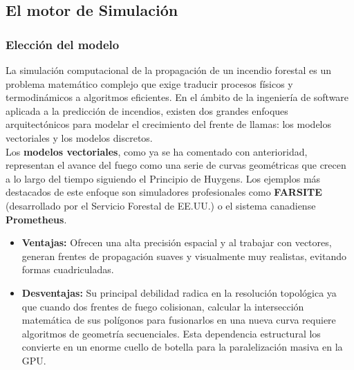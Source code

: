     \subsection{El motor de Simulación}
        \subsubsection*{Elección del modelo}
        La simulación computacional de la propagación de un incendio forestal es un problema matemático complejo que exige traducir procesos físicos y termodinámicos a algoritmos eficientes. En el ámbito de la ingeniería de software aplicada a la predicción de incendios, existen dos grandes enfoques arquitectónicos para modelar el crecimiento del frente de llamas: los modelos vectoriales y los modelos discretos.\\

        Los \textbf{modelos vectoriales}, como ya se ha comentado con anterioridad, representan el avance del fuego como una serie de curvas geométricas que crecen a lo largo del tiempo siguiendo el Principio de Huygens\cite{enders2009huygens}. Los ejemplos más destacados de este enfoque son simuladores profesionales como \textbf{FARSITE} (desarrollado por el Servicio Forestal de EE.UU.) o el sistema canadiense \textbf{Prometheus}.
        \begin{itemize}
            \item \textbf{Ventajas:} Ofrecen una alta precisión espacial y al trabajar con vectores, generan frentes de propagación suaves y visualmente muy realistas, evitando formas cuadriculadas.
            \item \textbf{Desventajas:} Su principal debilidad radica en la resolución topológica ya que cuando dos frentes de fuego colisionan, calcular la intersección matemática de sus polígonos para fusionarlos en una nueva curva requiere algoritmos de geometría secuenciales. Esta dependencia estructural los convierte en un enorme cuello de botella para la paralelización masiva en la GPU.
        \end{itemize}

